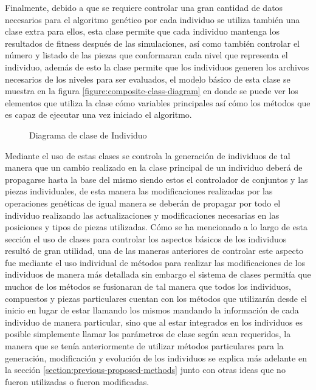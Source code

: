 Finalmente, debido a que se requiere controlar una gran cantidad de datos
necesarios para el algoritmo genético por cada individuo se utiliza también una
clase extra para ellos, esta clase permite que cada individuo mantenga los
resultados de fitness después de las simulaciones, así como también controlar el
número y listado de las piezas que conformaran cada nivel que representa el
individuo, además de esto la clase permite que los individuos generen los
archivos necesarios de los niveles para ser evaluados, el modelo básico de esta
clase se muestra en la figura \ref{figure:composite-class-diagram} en donde se
puede ver los elementos que utiliza la clase cómo variables principales así cómo
los métodos que es capaz de ejecutar una vez iniciado el algoritmo.

\begin{figure}
  \centering
  \scalebox{.65}{}
  \caption{Diagrama de clase de Individuo}
  \label{figure:individual-class-diagram}
\end{figure}

Mediante el uso de estas clases se controla la generación de individuos de tal
manera que un cambio realizado en la clase principal de un individuo deberá de
propagarse hasta la base del mismo siendo estos el controlador de conjuntos y
las piezas individuales, de esta manera las modificaciones realizadas por las
operaciones genéticas de igual manera se deberán de propagar por todo el
individuo realizando las actualizaciones y modificaciones necesarias en las
posiciones y tipos de piezas utilizadas. Cómo se ha mencionado a lo largo de
esta sección el uso de clases para controlar los aspectos básicos de los
individuos resultó de gran utilidad, una de las maneras anteriores de controlar
este aspecto fue mediante el uso individual de métodos para realizar las
modificaciones de los individuos de manera más detallada sin embargo el sistema
de clases permitía que muchos de los métodos se fusionaran de tal manera que
todos los individuos, compuestos y piezas particulares cuentan con los métodos
que utilizarán desde el inicio en lugar de estar llamando los mismos mandando la
información de cada individuo de manera particular, sino que al estar integrados
en los individuos es posible simplemente llamar los parámetros de clase según
sean requeridos, la manera que se tenía anteriormente de utilizar métodos
particulares para la generación, modificación y evolución de los individuos se
explica más adelante en la sección \ref{section:previous-proposed-methods} junto
con otras ideas que no fueron utilizadas o fueron modificadas.

